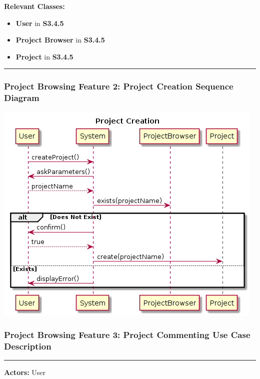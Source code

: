 \documentclass[twoside,letterpaper]{article}
\begin{document}
\noindent\textbf{Relevant Classes:}
\begin{itemize}
	\item \textbf{User} in \textbf{S3.4.5}
	\item \textbf{Project Browser} in \textbf{S3.4.5}
	\item \textbf{Project} in \textbf{S3.4.5}
\end{itemize}
\vspace{8pt}
\hrule
\newpage
\subsubsection[Project Browsing Feature 2: Project Creation Sequence Diagram]{\rmfamily\bfseries\color{black}
	Project Browsing Feature 2: Project Creation Sequence Diagram}
\hypertarget{RefHeading22059017292}{}

\bigskip

\includegraphics[width=\textwidth]{images/SequenceDiagrams/ProjectBrowsingProjectCreation}

\newpage
\subsubsection[Project Browsing Feature 3: Project Commenting Use Case Description]{\rmfamily\bfseries\color{black}
Project Browsing Feature 3: Project Commenting Use Case Description}
\hypertarget{RefHeading22059017292}{}

\vspace{2pt}
\hrule
\vspace{8pt}
\textbf{Actors:} User \newline
\end{document}
